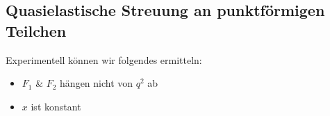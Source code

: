 \documentclass[Ex4_Zusammenfassung.tex]{subfiles}
\begin{document}
\subsection*{Quasielastische Streuung an punktförmigen Teilchen}
Experimentell können wir folgendes ermitteln:
\begin{itemize}
	\item $F_1$ \& $F_2$ hängen nicht von $q^2$ ab
	\item $x$ ist konstant
\end{itemize}

%		
%		
\end{document}
